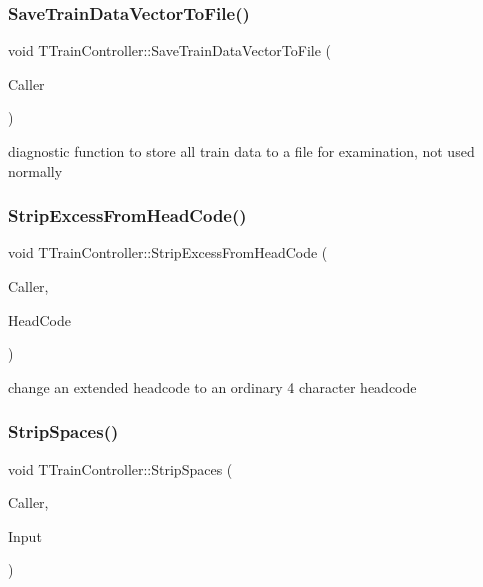 \subsubsection{\texorpdfstring{Save\+Train\+Data\+Vector\+To\+File()}{SaveTrainDataVectorToFile()}}
{\footnotesize\ttfamily void T\+Train\+Controller\+::\+Save\+Train\+Data\+Vector\+To\+File (\begin{DoxyParamCaption}\item[{int}]{Caller }\end{DoxyParamCaption})}

diagnostic function to store all train data to a file for examination, not used normally \mbox{\label{class_t_train_controller_ac47f05f3d0baaf235c430b631c6fd1ad}} 
\subsubsection{\texorpdfstring{Strip\+Excess\+From\+Head\+Code()}{StripExcessFromHeadCode()}}
{\footnotesize\ttfamily void T\+Train\+Controller\+::\+Strip\+Excess\+From\+Head\+Code (\begin{DoxyParamCaption}\item[{int}]{Caller,  }\item[{Ansi\+String \&}]{Head\+Code }\end{DoxyParamCaption})}

change an extended headcode to an ordinary 4 character headcode \mbox{\label{class_t_train_controller_ab0481dd8db0f3f99811f2cdc5b5dfd32}} 
\subsubsection{\texorpdfstring{Strip\+Spaces()}{StripSpaces()}}
{\footnotesize\ttfamily void T\+Train\+Controller\+::\+Strip\+Spaces (\begin{DoxyParamCaption}\item[{int}]{Caller,  }\item[{Ansi\+String \&}]{Input }\end{DoxyParamCaption})}

